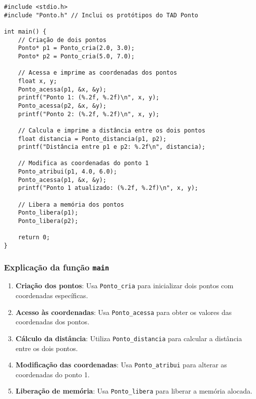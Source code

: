 \begin{verbatim}
#include <stdio.h>
#include "Ponto.h" // Inclui os protótipos do TAD Ponto

int main() {
    // Criação de dois pontos
    Ponto* p1 = Ponto_cria(2.0, 3.0);
    Ponto* p2 = Ponto_cria(5.0, 7.0);

    // Acessa e imprime as coordenadas dos pontos
    float x, y;
    Ponto_acessa(p1, &x, &y);
    printf("Ponto 1: (%.2f, %.2f)\n", x, y);
    Ponto_acessa(p2, &x, &y);
    printf("Ponto 2: (%.2f, %.2f)\n", x, y);

    // Calcula e imprime a distância entre os dois pontos
    float distancia = Ponto_distancia(p1, p2);
    printf("Distância entre p1 e p2: %.2f\n", distancia);

    // Modifica as coordenadas do ponto 1
    Ponto_atribui(p1, 4.0, 6.0);
    Ponto_acessa(p1, &x, &y);
    printf("Ponto 1 atualizado: (%.2f, %.2f)\n", x, y);

    // Libera a memória dos pontos
    Ponto_libera(p1);
    Ponto_libera(p2);

    return 0;
}
\end{verbatim}

\subsubsection{Explicação da função \texttt{main}}

\begin{enumerate}
    \item \textbf{Criação dos pontos}: Usa \texttt{Ponto\_cria} para inicializar dois pontos com coordenadas específicas.
    \item \textbf{Acesso às coordenadas}: Usa \texttt{Ponto\_acessa} para obter os valores das coordenadas dos pontos.
    \item \textbf{Cálculo da distância}: Utiliza \texttt{Ponto\_distancia} para calcular a distância entre os dois pontos.
    \item \textbf{Modificação das coordenadas}: Usa \texttt{Ponto\_atribui} para alterar as coordenadas do ponto 1.
    \item \textbf{Liberação de memória}: Usa \texttt{Ponto\_libera} para liberar a memória alocada.
\end{enumerate}